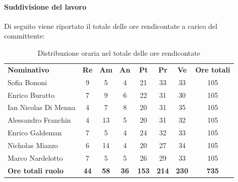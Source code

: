 \documentclass[../piano-di-progetto.tex]{subfiles}
\begin{document}
    \paragraph{Suddivisione del lavoro}
    Di seguito viene riportato il totale delle ore rendicontate a carico del committente:
    \begin{table}[H]
      \centering
      \begin{tabular}{lccccccc}
        \rowcolor{lightgray}
        \textbf{Nominativo}        & \textbf{Re} & \textbf{Am}  & \textbf{An} & \textbf{Pt}  & \textbf{Pr}   & \textbf{Ve} & \textbf{Ore totali} \\
        Sofia Bononi              & 9           & 5           & 4           & 21           & 33           & 33           & 105          \\
        Enrico Buratto            & 7           & 9           & 6           & 22           & 31           & 30           & 105          \\
        Ian Nicolas Di Menna      & 4           & 7           & 8           & 20           & 31           & 35           & 105          \\
        Alessandro Franchin       & 4           & 13          & 5           & 20           & 31           & 32           & 105          \\
        Enrico Galdeman           & 7           & 5           & 4           & 24           & 32           & 33           & 105          \\
        Nicholas Miazzo           & 6           & 14          & 4           & 20           & 27           & 34           & 105          \\
        Marco Nardelotto          & 7           & 5           & 5           & 26           & 29           & 33           & 105          \\
        \textbf{Ore totali ruolo} & \textbf{44} & \textbf{58} & \textbf{36} & \textbf{153} & \textbf{214} & \textbf{230} & \textbf{735}
      \end{tabular}
      \caption{Distribuzione oraria nel totale delle ore rendicontate}
      \end{table}
  
\end{document}
